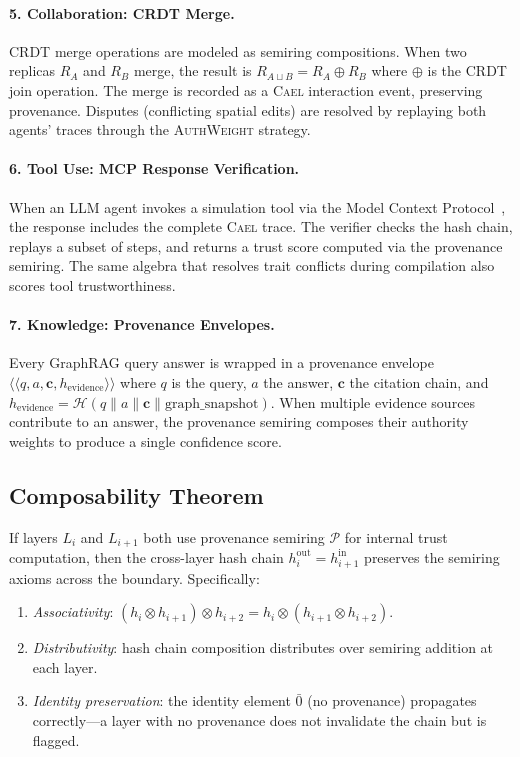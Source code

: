 \documentclass[sigchi-a]{acmart}
\newcommand{\cael}{\textsc{Cael}}
\newcommand{\tropplus}{\oplus}
\newcommand{\tropmult}{\otimes}
\newcommand{\hashfn}{\mathcal{H}}
\newcommand{\prov}[1]{\langle\!\langle #1 \rangle\!\rangle}
\begin{document}
\paragraph{5. Collaboration: CRDT Merge.}
CRDT merge operations are modeled as semiring compositions. When two replicas
$R_A$ and $R_B$ merge, the result is
$R_{A \sqcup B} = R_A \tropplus R_B$ where $\tropplus$ is the CRDT join
operation. The merge is recorded as a \cael{} interaction event, preserving
provenance. Disputes (conflicting spatial edits) are resolved by replaying
both agents' traces through the \textsc{AuthWeight} strategy.

\paragraph{6. Tool Use: MCP Response Verification.}
When an LLM agent invokes a simulation tool via the Model Context
Protocol~\cite{mcp-spec}, the response includes the complete \cael{} trace.
The verifier checks the hash chain, replays a subset of steps, and returns
a trust score computed via the provenance semiring. The same algebra that
resolves trait conflicts during compilation also scores tool trustworthiness.

\paragraph{7. Knowledge: Provenance Envelopes.}
Every GraphRAG query answer is wrapped in a provenance envelope $\prov{q, a,
\mathbf{c}, h_{\text{evidence}}}$ where $q$ is the query, $a$ the answer,
$\mathbf{c}$ the citation chain, and $h_{\text{evidence}} = \hashfn(q \| a
\| \mathbf{c} \| \text{graph\_snapshot})$. When multiple evidence sources
contribute to an answer, the provenance semiring composes their authority
weights to produce a single confidence score.

\subsection{Composability Theorem}

\begin{theorem}
\label{thm:composability}
If layers $L_i$ and $L_{i+1}$ both use provenance semiring $\mathcal{P}$
for internal trust computation, then the cross-layer hash chain
$h_i^{\text{out}} = h_{i+1}^{\text{in}}$ preserves the semiring axioms
across the boundary. Specifically:
\begin{enumerate}
  \item \emph{Associativity}: $(h_i \tropmult h_{i+1}) \tropmult h_{i+2} =
    h_i \tropmult (h_{i+1} \tropmult h_{i+2})$.
  \item \emph{Distributivity}: hash chain composition distributes over
    semiring addition at each layer.
  \item \emph{Identity preservation}: the identity element $\bar{0}$ (no
    provenance) propagates correctly---a layer with no provenance does not
    invalidate the chain but is flagged.
\end{enumerate}
\end{theorem}
\end{document}

